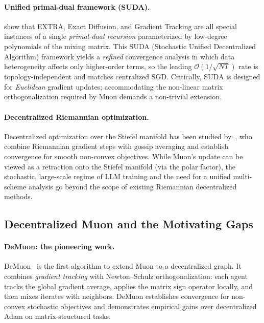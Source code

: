 \paragraph{Unified primal-dual framework (SUDA).}
\citet{alghunaim2022unified} show that EXTRA, Exact Diffusion, and Gradient
Tracking are all special instances of a single \emph{primal-dual recursion}
parameterized by low-degree polynomials of the mixing matrix.  This SUDA
(Stochastic Unified Decentralized Algorithm) framework yields a \emph{refined}
convergence analysis in which data heterogeneity affects only higher-order
terms, so the leading $\mathcal{O}(1/\sqrt{NT})$ rate is topology-independent
and matches centralized SGD.  Critically, SUDA is designed for \emph{Euclidean}
gradient updates; accommodating the non-linear matrix orthogonalization
required by Muon demands a non-trivial extension.

\paragraph{Decentralized Riemannian optimization.}
Decentralized optimization over the Stiefel manifold has been studied
by~\citet{chen2021decentralized}, who combine Riemannian gradient steps with
gossip averaging and establish convergence for smooth non-convex objectives.
While Muon's update can be viewed as a retraction onto the Stiefel manifold
(via the polar factor), the stochastic, large-scale regime of LLM training
and the need for a unified multi-scheme analysis go beyond the scope of
existing Riemannian decentralized methods.

\subsection{Decentralized Muon and the Motivating Gaps}
\label{subsec:demuon}

\paragraph{DeMuon: the pioneering work.}
DeMuon~\citep{he2025demuon} is the first algorithm to extend Muon to a
decentralized graph.  It combines \emph{gradient tracking} with Newton--Schulz
orthogonalization: each agent tracks the global gradient average, applies the
matrix sign operator locally, and then mixes iterates with neighbors.
DeMuon establishes convergence for non-convex stochastic objectives and
demonstrates empirical gains over decentralized Adam on matrix-structured tasks.

